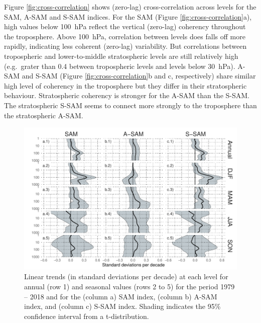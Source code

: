 \documentclass[smallextended]{svjour3}       %
\begin{document}
Figure \ref{fig:cross-correlation} shows (zero-lag) cross-correlation across levels for the SAM, A\nobreakdash-SAM and S\nobreakdash-SAM indices. For the SAM (Figure \ref{fig:cross-correlation}a), high values below 100~hPa reflect the vertical (zero-lag) coherency throughout the troposphere. Above 100~hPa, correlation between levels does falls off more rapidly, indicating less coherent (zero-lag) variability. But correlations between tropospheric and lower-to-middle stratospheric levels are still relatively high (e.g.~grater than 0.4 between tropospheric levels and levels below 30~hPa). A\nobreakdash-SAM and S\nobreakdash-SAM (Figure \ref{fig:cross-correlation}b and c, respectively) share similar high level of coherency in the troposphere but they differ in their stratospheric behaviour. Stratospheric coherency is stronger for the A\nobreakdash-SAM than the S\nobreakdash-SAM. The stratospheric S\nobreakdash-SAM seems to connect more strongly to the troposphere than the stratospheric A\nobreakdash-SAM.

\begin{figure}
\includegraphics{trends-1} \caption{Linear trends (in standard deviations per decade) at each level for annual (row 1) and seasonal values (rows 2 to 5) for the period 1979 -- 2018 and for the (column a) SAM index, (column b) A\nobreakdash-SAM index, and (column c) S\nobreakdash-SAM index. Shading indicates the 95\% confidence interval from a t-distribution.}\label{fig:trends}
\end{figure}
\end{document}
